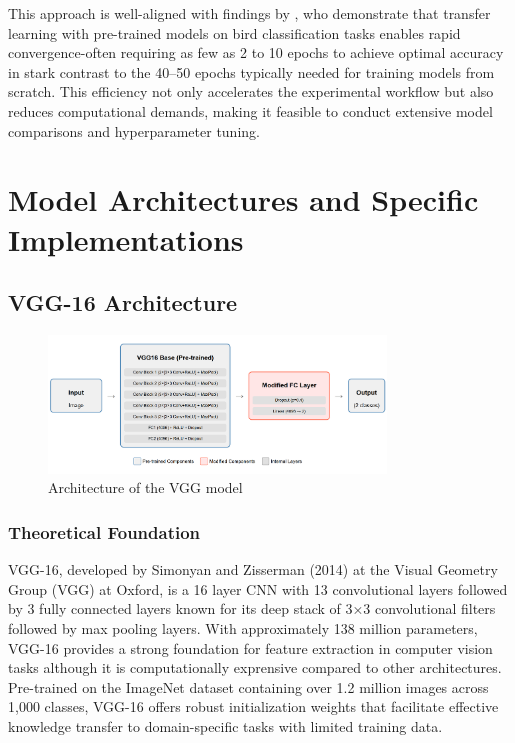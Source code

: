 \documentclass[a4paper,12pt]{report}
\begin{document}
This approach is well-aligned with findings by \citep{tan2018survey}, who demonstrate that transfer learning with pre-trained models on bird classification tasks enables rapid convergence-often requiring as few as 2 to 10 epochs to achieve optimal accuracy in stark contrast to the 40–50 epochs typically needed for training models from scratch. This efficiency not only accelerates the experimental workflow but also reduces computational demands, making it feasible to conduct extensive model comparisons and hyperparameter tuning.

\section{Model Architectures and Specific Implementations}

\subsection{VGG-16 Architecture}

\begin{figure}[H]
    \centering
    \includegraphics[width=0.8\textwidth]{images/architecture/vgg.png}
    \caption{Architecture of the VGG model}
    \label{fig:vgg_architecture}
\end{figure}


\subsubsection{Theoretical Foundation}

VGG-16, developed by Simonyan and Zisserman (2014) \citep{simonyan2014vgg} at the Visual Geometry Group (VGG) at Oxford, is a 16 layer CNN with 13 convolutional layers followed by 3 fully connected layers known for its deep stack of 3×3 convolutional filters followed by max pooling layers. With approximately 138 million parameters, VGG-16 provides a strong foundation for feature extraction in computer vision tasks although it is computationally exprensive compared to other architectures. Pre-trained on the ImageNet dataset containing over 1.2 million images across 1,000 classes, VGG-16 offers robust initialization weights that facilitate effective knowledge transfer to domain-specific tasks with limited training data.
\end{document}
